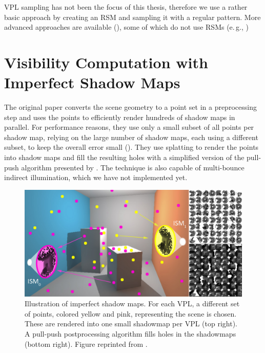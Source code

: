 VPL sampling has not been the focus of this thesis, therefore we use a rather basic approach by creating an RSM and sampling it with a regular pattern. More advanced approaches are available (), some of which do not use RSMs (e.\,g., \cite{hedman2016sequential})


\section{Visibility Computation with Imperfect Shadow Maps}
\label{sec:concept:ism}

The original paper \citep{ritschel2008ism} converts the scene geometry to a point set in a preprocessing step and uses the points to efficiently render hundreds of shadow maps in parallel. For performance reasons, they use only a small subset of all points per shadow map, relying on the large number of shadow maps, each using a different subset, to keep the overall error small (). They use splatting to render the points into shadow maps and fill the resulting holes with a simplified version of the pull-push algorithm presented by \citet{Marroquim:2007:reconstruction}. The technique is also capable of multi-bounce indirect illumination, which we have not implemented yet.

\begin{figure}[htb]
\centering
    \includegraphics[width=\textwidth]{graphics/ism_ritschel_08}
  \caption{Illustration of imperfect shadow maps. For each VPL, a different set of points, colored yellow and pink, representing the scene is chosen. These are rendered into one small shadowmap per VPL (top right). A pull-push postprocessing algorithm fills holes in the shadowmaps (bottom right). Figure reprinted from \citet{ritschel2008ism}.}
  \label{fig:concept:ism_ritschel_08}
\end{figure}

